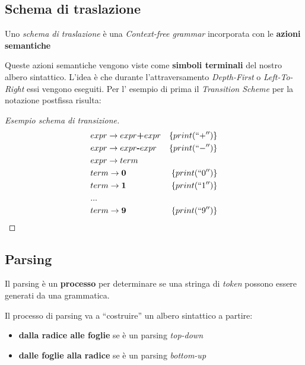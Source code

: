 \subsection{Schema di traslazione}
\label{sec:schema_traslazione}
\begin{definition}
Uno \textit{schema di traslazione} è una \textit{Context-free grammar}
incorporata con le \textbf{azioni semantiche}
\end{definition}

Queste azioni semantiche vengono viste come \textbf{simboli terminali} del
nostro albero sintattico. L'idea è che durante l'attraversamento
\textit{Depth-First} o \textit{Left-To-Right} essi vengono eseguiti. Per l'
esempio di prima il \textit{Transition Scheme} per la notazione postfissa
risulta:

\begin{proof}[Esempio schema di transizione]
\begin{align*}
& expr \to expr \textbf{+} expr & \{print(``+'')\} \\
& expr \to expr \textbf{-} expr & \{print(``-'')\} \\
& expr \to term                                    \\
& term \to \textbf{0}           & \{print(``0'')\} \\
& term \to \textbf{1}           & \{print(``1'')\} \\
& ...                                              \\
& term \to \textbf{9}           & \{print(``9'')\} \\
\end{align*}
\end{proof}

\subsection{Parsing}
\begin{definition}[Parsing]
Il parsing è un \textbf{processo} per determinare se una stringa di
\textit{token} possono essere generati da una grammatica.
\end{definition}

Il processo di parsing va a ``costruire'' un albero sintattico a partire:
\begin{itemize}
\item \textbf{dalla radice alle foglie} se è un parsing \textit{top-down}
\item \textbf{dalle foglie alla radice} se è un parsing \textit{bottom-up}
\end{itemize}

